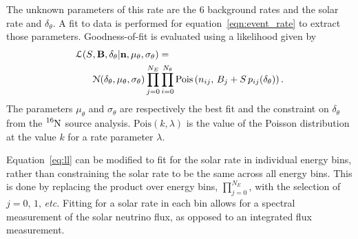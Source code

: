 The unknown parameters of this rate are the 6 background rates and the solar
rate and $\delta_{\theta}$.
A fit to data is performed for equation~\eqref{eqn:event_rate} to extract
those parameters.
Goodness-of-fit is evaluated using a likelihood given by
\begin{align}
    \mathcal{L}(S&, \bold{B}, \delta_{\theta} | \bold{n}, \mu_{\theta}, \sigma_{\theta}) = \nonumber\\
    &\mathcal{N}(\delta_{\theta}, \mu_{\theta}, \sigma_\theta)
    \prod_{j=0}^{N_E}\prod^{N_{\theta}}_{i=0} \text{Pois}\left(n_{ij},\, B_{j} + S\,p_{ij}(\delta_{\theta})\right)\text{.}
    \label{eq:ll}
\end{align}
The parameters $\mu_{\theta}$ and $\sigma_{\theta}$ are respectively the best
fit and the constraint on $\delta_{\theta}$ from the $\ce{^{16}N}$ source
analysis.
$\text{Pois}\left(k, \lambda \right)$ is the value of the Poisson distribution
at the value $k$ for a rate parameter $\lambda$.

Equation~\eqref{eq:ll} can be modified to fit for the solar rate in individual
energy bins, rather than constraining the solar rate to be the same across
all energy bins. This is done by replacing the product over energy bins,
$\prod_{j=0}^{N_E}$, with the selection of $j=0\text{, }1\text{, }$\textit{etc.}
Fitting for a solar rate in each bin allows for a spectral measurement of the
solar neutrino flux, as opposed to an integrated flux measurement.
